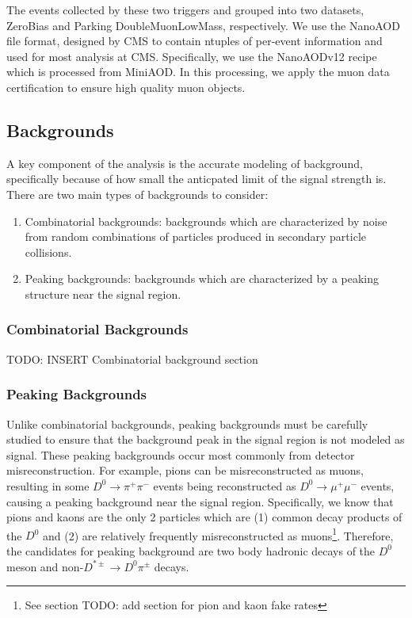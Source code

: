 The events collected by these two triggers and grouped into two datasets, ZeroBias and Parking DoubleMuonLowMass, respectively. We use the NanoAOD file format, designed by CMS to contain ntuples of per-event information and used for most analysis at CMS. Specifically, we use the NanoAODv12 recipe which is processed from MiniAOD. In this processing, we apply the muon data certification to ensure high quality muon objects. 

\subsection{Backgrounds}

A key component of the analysis is the accurate modeling of background, specifically because of how small the anticpated limit of the signal strength is. There are two main types of backgrounds to consider: 
\begin{enumerate}
    \item Combinatorial backgrounds: backgrounds which are characterized by noise from random combinations of particles produced in secondary particle collisions. 
    \item Peaking backgrounds: backgrounds which are characterized by a peaking structure near the signal region.
\end{enumerate}

\subsubsection{Combinatorial Backgrounds}

TODO: INSERT Combinatorial background section

\subsubsection{Peaking Backgrounds}

Unlike combinatorial backgrounds, peaking backgrounds must be carefully studied to ensure that the background peak in the signal region is not modeled as signal. These peaking backgrounds occur most commonly from detector misreconstruction. For example, pions can be misreconstructed as muons, resulting in some $D^0 \to \pi^+ \pi^-$ events being reconstructed as $D^0 \to \mu^+ \mu^-$ events, causing a peaking background near the signal region. Specifically, we know that pions and kaons are the only 2 particles which are (1) common decay products of the $D^0$ and (2) are relatively frequently misreconstructed as muons\footnote{See section TODO: add section for pion and kaon fake rates}. Therefore, the candidates for peaking background are two body hadronic decays of the $D^0$ meson and non-$D^{*\pm} \to D^0 \pi^\pm$ decays. 

